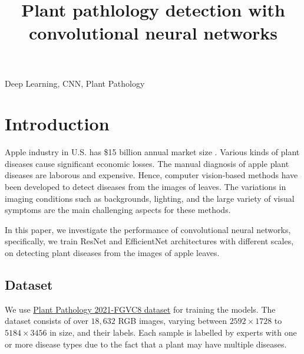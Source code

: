 \documentclass[conference]{IEEEtran}
\begin{document}

\title{Plant pathlology detection with convolutional neural networks\\ }

\author{
}


\maketitle

\begin{abstract}
\end{abstract}

\begin{IEEEkeywords}
Deep Learning, CNN, Plant Pathology
\end{IEEEkeywords}

\section{Introduction}

Apple industry in U.S. has \$15 billion annual market size \cite{Thapa2020}. 
Various kinds of plant diseases cause significant economic losses. 
The manual diagnosis of apple plant diseases are laborous and expensive. 
Hence, computer vision-based methods have been developed to detect diseases from the images of leaves. 
The variations in imaging conditions such as backgrounds, lighting, and the large variety of visual symptoms are the main challenging aspects for these methods. 

In this paper, we investigate the performance of convolutional neural networks, 
specifically, we train ResNet \cite{ResNet2016} 
and EfficientNet \cite{EfficientNet} architectures with different scales, 
on detecting plant diseases from the images of apple leaves. 

\subsection{Dataset}
We use \href{https://www.kaggle.com/c/plant-pathology-2021-fgvc8/overview}{Plant Pathology 2021-FGVC8 dataset} \cite{Thapa2020} for training the models. 
The dataset consists of over $18,632$ RGB images, 
varying between $2592 \times 1728$ to $5184 \times 3456$ in size, 
and their labels. Each sample is labelled by experts with one or more disease types 
due to the fact that a plant may have multiple diseases. 
\end{document}

